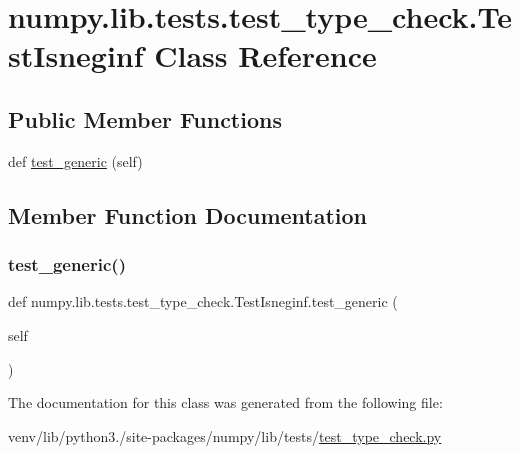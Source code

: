 \hypertarget{classnumpy_1_1lib_1_1tests_1_1test__type__check_1_1TestIsneginf}{}\section{numpy.\+lib.\+tests.\+test\+\_\+type\+\_\+check.\+Test\+Isneginf Class Reference}
\label{classnumpy_1_1lib_1_1tests_1_1test__type__check_1_1TestIsneginf}
\subsection*{Public Member Functions}
\begin{DoxyCompactItemize}
\item 
def \hyperlink{classnumpy_1_1lib_1_1tests_1_1test__type__check_1_1TestIsneginf_ad179f5a8c96ba6c1fa9b196aaa006a65}{test\+\_\+generic} (self)
\end{DoxyCompactItemize}


\subsection{Member Function Documentation}
\mbox{\label{classnumpy_1_1lib_1_1tests_1_1test__type__check_1_1TestIsneginf_ad179f5a8c96ba6c1fa9b196aaa006a65}} 
\subsubsection{\texorpdfstring{test\+\_\+generic()}{test\_generic()}}
{\footnotesize\ttfamily def numpy.\+lib.\+tests.\+test\+\_\+type\+\_\+check.\+Test\+Isneginf.\+test\+\_\+generic (\begin{DoxyParamCaption}\item[{}]{self }\end{DoxyParamCaption})}



The documentation for this class was generated from the following file\+:\begin{DoxyCompactItemize}
\item 
venv/lib/python3./site-\/packages/numpy/lib/tests/\hyperlink{test__type__check_8py}{test\+\_\+type\+\_\+check.\+py}\end{DoxyCompactItemize}
